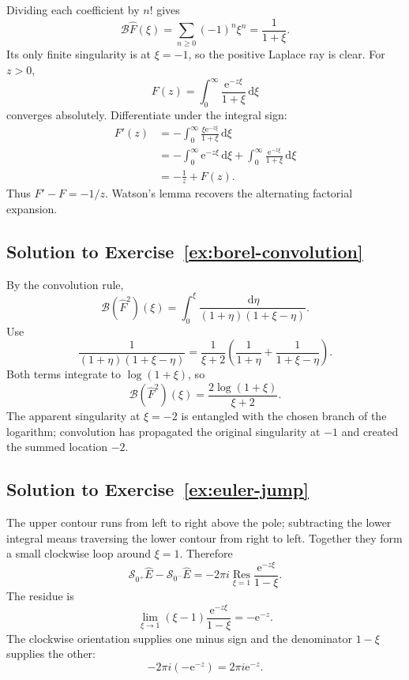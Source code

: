 \documentclass[11pt,oneside]{book}
\theoremstyle{definition}
\theoremstyle{remark}
\newcommand{\Borel}{\mathcal{B}}
\newcommand{\e}{\mathrm{e}}
\newcommand{\dd}{\,\mathrm{d}}
\begin{document}
Dividing each coefficient by $n!$ gives
\[
  \Borel\widehat F(\xi)
  =\sum_{n\ge0}(-1)^n\xi^n
  =\frac1{1+\xi}.
\]
Its only finite singularity is at $\xi=-1$, so the positive Laplace ray is clear.
For $z>0$,
\begin{equation}
  F(z)=\int_0^\infty\frac{\e^{-z\xi}}{1+\xi}\dd\xi
  \label{eq:alternating-euler-sum}
\end{equation}
converges absolutely. Differentiate under the integral sign:
\begin{align*}
  F'(z)
  &=-\int_0^\infty\frac{\xi\e^{-z\xi}}{1+\xi}\dd\xi\\
  &=-\int_0^\infty\e^{-z\xi}\dd\xi
    +\int_0^\infty\frac{\e^{-z\xi}}{1+\xi}\dd\xi\\
  &=-\frac1z+F(z).
\end{align*}
Thus $F'-F=-1/z$. Watson's lemma recovers the alternating factorial expansion.

\subsection*{Solution to Exercise~\ref{ex:borel-convolution}}

By the convolution rule,
\[
  \Borel(\widehat F^2)(\xi)
  =\int_0^\xi
    \frac{\dd\eta}{(1+\eta)(1+\xi-\eta)}.
\]
Use
\[
  \frac1{(1+\eta)(1+\xi-\eta)}
  =\frac1{\xi+2}
   \left(\frac1{1+\eta}+\frac1{1+\xi-\eta}\right).
\]
Both terms integrate to $\log(1+\xi)$, so
\[
  \boxed{
  \Borel(\widehat F^2)(\xi)
  =\frac{2\log(1+\xi)}{\xi+2}}.
\]
The apparent singularity at $\xi=-2$ is entangled with the chosen branch of the
logarithm; convolution has propagated the original singularity at $-1$ and
created the summed location $-2$.

\subsection*{Solution to Exercise~\ref{ex:euler-jump}}

The upper contour runs from left to right above the pole; subtracting the lower
integral means traversing the lower contour from right to left. Together they
form a small clockwise loop around $\xi=1$. Therefore
\[
  \mathcal S_{0^+}\widehat E-
  \mathcal S_{0^-}\widehat E
  =-2\pi i\operatorname*{Res}_{\xi=1}
    \frac{\e^{-z\xi}}{1-\xi}.
\]
The residue is
\[
  \lim_{\xi\to1}
  (\xi-1)\frac{\e^{-z\xi}}{1-\xi}
  =-\e^{-z}.
\]
The clockwise orientation supplies one minus sign and the denominator
$1-\xi$ supplies the other:
\[
  -2\pi i(-\e^{-z})=2\pi i\e^{-z}.
\]
\end{document}
